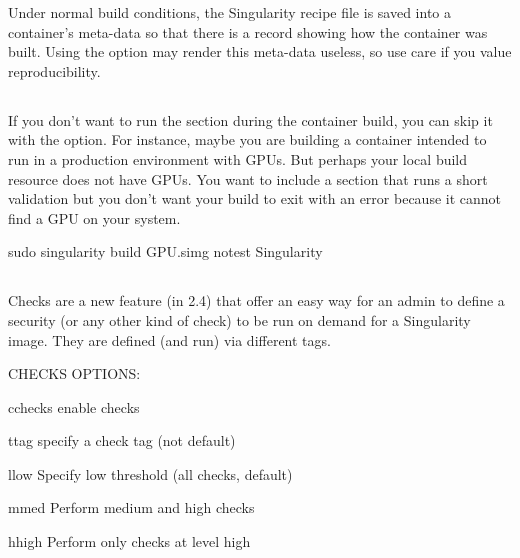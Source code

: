 \documentclass[letterpaper,10pt,english]{sphinxmanual}
\begin{document}
Under normal build conditions, the Singularity recipe file is saved into
a container’s meta-data so that there is a record showing how the
container was built. Using the  option may render this meta-data useless,
so use care if you value reproducibility.


\subsection{}
\label{\detokenize{build_a_container:notest}}
If you don’t want to run the  section during the container build, you can
skip it with the  option. For instance, maybe you are building a
container intended to run in a production environment with GPUs. But
perhaps your local build resource does not have GPUs. You want to
include a  section that runs a short validation but you don’t want your
build to exit with an error because it cannot find a GPU on your system.

%
\begin{sphinxVerbatim}[commandchars=\\\{\}]
\PYGZdl{} sudo singularity build GPU.simg \PYGZhy{}\PYGZhy{}notest Singularity
\end{sphinxVerbatim}


\subsection{}
\label{\detokenize{build_a_container:checks}}
Checks are a new feature (in 2.4) that offer an easy way for an admin
to define a security (or any other kind of check) to be run on demand
for a Singularity image. They are defined (and run) via different
tags.

%
\begin{sphinxVerbatim}[commandchars=\\\{\}]
CHECKS OPTIONS:

    \PYGZhy{}c\textbar{}\PYGZhy{}\PYGZhy{}checks    enable checks

    \PYGZhy{}t\textbar{}\PYGZhy{}\PYGZhy{}tag       specify a check tag (not default)

    \PYGZhy{}l\textbar{}\PYGZhy{}\PYGZhy{}low       Specify low threshold (all checks, default)

    \PYGZhy{}m\textbar{}\PYGZhy{}\PYGZhy{}med       Perform medium and high checks

    \PYGZhy{}h\textbar{}\PYGZhy{}\PYGZhy{}high      Perform only checks at level high
\end{sphinxVerbatim}
\end{document}
